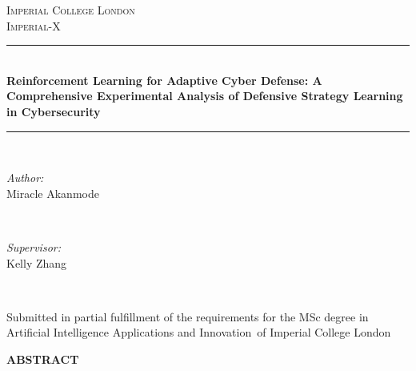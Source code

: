 \documentclass[12pt,twoside]{article}
\newcommand{\reporttitle}{Reinforcement Learning for Adaptive Cyber Defense: A Comprehensive Experimental Analysis of Defensive Strategy Learning in Cybersecurity}
\newcommand{\thesisauthor}{Miracle Akanmode}
\newcommand{\supervisor}{Kelly Zhang}
\newcommand{\degreetype}{Artificial Intelligence Applications and Innovation}
\theoremstyle{definition}
\theoremstyle{plain}
\begin{document}
\begin{titlepage}

\newcommand{\HRule}{\rule{\linewidth}{0.5mm}} %


\center

\textsc{\Large Imperial College London}\\[0.5cm]
\textsc{\large Imperial-X}\\[0.5cm]

\HRule \\[0.4cm]
{ \huge \bfseries \reporttitle}\\
\HRule \\[1.5cm]

\begin{minipage}{0.4\textwidth}
\begin{flushleft} \large
\emph{Author:}\\
\thesisauthor
\end{flushleft}
\end{minipage}
~
\begin{minipage}{0.4\textwidth}
\begin{flushright} \large
\emph{Supervisor:} \\
\supervisor
\end{flushright}
\end{minipage}\\[4cm]

\vfill

{\large Submitted in partial fulfillment of the requirements for the MSc degree in\\
\degreetype~of Imperial College London}\\[1cm]

\makeatletter
\@date
\makeatother

\end{titlepage}


\tableofcontents
\clearpage  %

\begin{center}
\large\textbf{ABSTRACT}
\end{center}
\end{document}

